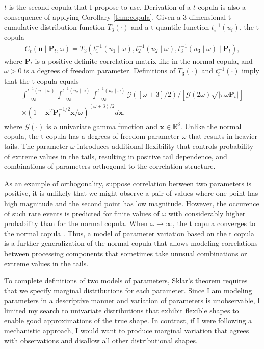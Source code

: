 \documentclass[12pt]{report}
\begin{document}
$t$ is the second copula that I propose to use. Derivation of a $t$ copula is also a consequence of applying Corollary \ref{thm:copula}. Given a 3-dimensional t cumulative distribution function $T_3(\cdot)$ and a t quantile function $t_i^{-1}(u_i)$, the t copula 
%
\begin{eqnarray}
C_t(\boldsymbol{u} \mid \boldsymbol{P}_t,\omega) = T_3(t_1^{-1}(u_1 \mid \omega),
           t_2^{-1}(u_2 \mid \omega),
           t_3^{-1}(u_3 \mid \omega) \mid \boldsymbol{P}_t), 
\end{eqnarray}
where $\boldsymbol{P}_t$ is a positive definite correlation matrix like in the normal copula, and $\omega > 0$ is a degrees of freedom parameter.
Definitions of $T_3(\cdot)$ and $t_i^{-1}(\cdot)$ imply that the t copula equals
\begin{eqnarray}
\int_{-\infty}^{t^{-1}(u_1 \mid \omega)}
       \int_{-\infty}^{t^{-1}(u_2 \mid \omega)}
       \int_{-\infty}^{t^{-1}(u_3 \mid \omega)}
       \mathcal{G} \left([\omega+3] / 2\right) / \left[\mathcal{G}(2\omega)\sqrt{|\pi\omega\boldsymbol{P}_t|}\right]  \nonumber \\  
\times \left( 1 + \boldsymbol{x}^T\boldsymbol{P}_t^{-1 / 2}\boldsymbol{x} /
{\omega} \right)^{(\omega + 3) / 2}d\boldsymbol{x},
\end{eqnarray}
%
where $\mathcal{G}(\cdot)$ is a univariate gamma function and $\boldsymbol{x} \in \mathbb{R}^3$.
Unlike the normal copula, the t copula has a degrees of freedom parameter $\omega$ that results in heavier tails. The parameter $\omega$ introduces
additional flexibility that controls probability of
extreme values in the tails, resulting in positive tail dependence, and combinations of parameters
orthogonal to the correlation structure. 

As an example of orthogonality, suppose correlation
between two parameters is positive, it is unlikely that we
might observe a pair of values where one point has high magnitude and
the second point has low magnitude. However, the occurence of
such rare events is predicted for finite values of
$\omega$ with considerably higher probability than for the normal copula. When $\omega \to \infty$, the t copula
converges to the normal copula \citep{Joe1997}. Thus, a model of parameter variation based on the t copula is a further generalization of the normal copula that allows modeling correlations between processing components that sometimes take unusual combinations or extreme values in the tails.

To complete definitions of two models of parameters, Sklar's theorem
requires that we specify marginal distributions for each
parameter. Since I am modeling parameters in a descriptive manner and variation of parameters is unobservable, I limited my search to univariate distributions that exhibit flexible shapes to enable good approximations of the true shape. In contrast, if I were following a mechanistic approach, I would want to produce marginal variation that agrees with observations and disallow all other distributional shapes.
\end{document}
